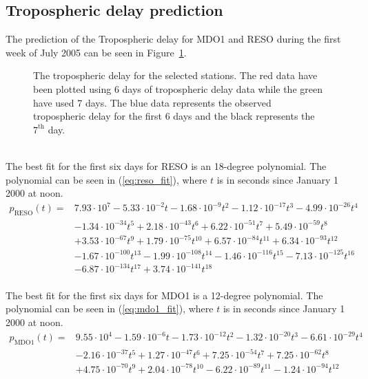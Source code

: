 \documentclass[12pt,a4paper]{article}
\begin{document}
\subsection{Tropospheric delay prediction}
The prediction of the Tropospheric delay for MDO1 and RESO during the first week of July 2005 can be seen in Figure~\ref{fig:trop_delay}.
\begin{figure}[!ht]
  \centering
  \noindent\makebox[\textwidth]{\scalebox{0.75}{}}
  \caption{The tropospheric delay for the selected stations. The red data have been plotted using 6 days of tropospheric delay data while the green have used 7 days. The blue data represents the observed tropospheric delay for the first 6 days and the black represents the $7^{\text{th}}$ day.}
  \label{fig:trop_delay}
\end{figure}\\

\noindent The best fit for the first six days for RESO is an 18-degree polynomial.
The polynomial can be seen in (\ref{eq:reso_fit}), where $t$ is in seconds since January 1 2000 at noon.
\begin{align}
  \label{eq:reso_fit}
  p_\text{RESO}(t) = & 7.93\cdot 10^{7} - 5.33\cdot 10^{-2}t - 1.68\cdot 10^{-9}t^{2} - 1.12\cdot 10^{-17}t^{3} - 4.99\cdot 10^{-26}t^{4} \nonumber \\
       & - 1.34\cdot 10^{-34}t^{5} + 2.18\cdot 10^{-43}t^{6} + 6.22\cdot 10^{-51}t^{7} + 5.49\cdot 10^{-59}t^{8} \nonumber \\
       & + 3.53\cdot 10^{-67}t^{9} + 1.79\cdot 10^{-75}t^{10} + 6.57\cdot 10^{-84}t^{11} + 6.34\cdot 10^{-93}t^{12} \nonumber \\
       & - 1.67\cdot 10^{-100}t^{13} - 1.99\cdot 10^{-108}t^{14} - 1.46\cdot 10^{-116}t^{15} - 7.13\cdot 10^{-125}t^{16} \nonumber \\
       & - 6.87\cdot 10^{-134}t^{17} + 3.74\cdot 10^{-141}t^{18}
\end{align}\\

\noindent The best fit for the first six days for MDO1 is a 12-degree polynomial.
The polynomial can be seen in (\ref{eq:mdo1_fit}), where $t$ is in seconds since January 1 2000 at noon.
\begin{align}
  \label{eq:mdo1_fit}
  p_\text{MDO1}(t) = & 9.55\cdot 10^{4} - 1.59\cdot 10^{-6}t - 1.73\cdot 10^{-12}t^{2} - 1.32\cdot 10^{-20}t^{3} - 6.61\cdot 10^{-29}t^{4} \nonumber \\
       & - 2.16\cdot 10^{-37}t^{5} + 1.27\cdot 10^{-47}t^{6} + 7.25\cdot 10^{-54}t^{7} + 7.25\cdot 10^{-62}t^{8} \nonumber \\
       & + 4.75\cdot 10^{-70}t^{9} + 2.04\cdot 10^{-78}t^{10} - 6.22\cdot 10^{-89}t^{11} - 1.24\cdot 10^{-94}t^{12}
\end{align}
\end{document}
